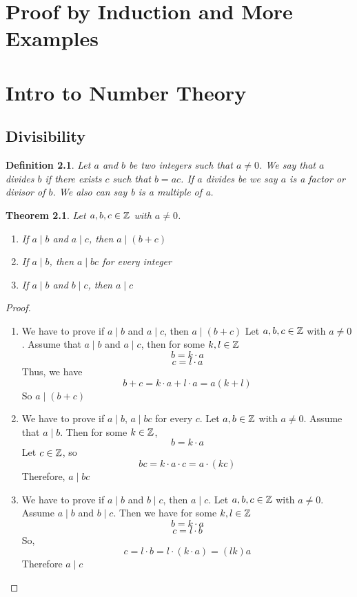 \documentclass[openany]{report}
\newtheorem{theorem}{Theorem}[section]
\newtheorem{definition}{Definition}[section]
\begin{document}
\chapter{Proof by Induction and More Examples}



\chapter{Intro to Number Theory}
\section{Divisibility}
\begin{definition}\label{definition4.1.1}
    Let $a$ and $b$ be two integers such that $a \neq 0$. We say that $a$ divides $b$ if there exists $c$ such that $b = ac$. If $a$ divides be we say $a$ is a factor or divisor of $b$. We also can say b is a multiple of a.
\end{definition}
\begin{theorem}\label{theorem4.1.1}
    Let $a,b,c \in \mathbb{Z}$ with $a \neq 0$.
    \begin{enumerate}
        \item If $a\mid b$ and $a \mid c$, then $a \mid (b + c)$
        \item If $a \mid b$, then $a \mid bc$ for every integer 
        \item If $a \mid b$ and $b \mid c$, then $a \mid c$
    \end{enumerate}
\end{theorem}
\begin{proof}
    \begin{enumerate}
        \item We have to prove if $a \mid b$ and $a\mid c$, then $a \mid (b + c)$
        Let $a,b,c \in \mathbb{Z}$ with $a \neq 0$. Assume that $a \mid b$ and $a \mid c$, then for some $k,l \in \mathbb{Z}$
        $$b = k \cdot a$$
        $$c = l \cdot a$$
        Thus, we have
        $$b + c = k \cdot a + l \cdot a  = a(k + l)$$
        So $a \mid (b+c)$
        \item We have to prove if $a \mid b$, $a \mid bc$ for every $c$. Let $a,b \in \mathbb{Z}$ with $a \neq 0$. Assume that $a \mid b$. Then for some $k \in \mathbb{Z}$,
        $$b = k \cdot a$$
        Let $c \in \mathbb{Z}$, so 
        $$bc = k \cdot a \cdot c = a \cdot (kc)$$
        Therefore, $a \mid bc$
        \item We have to prove if $a \mid b$ and $b \mid c$, then $a \mid c.$ Let $a,b,c \in \mathbb{Z}$ with $a \neq 0$. Assume $a \mid b$ and $b \mid c$. Then we have for some $k, l \in \mathbb{Z}$
        $$b = k \cdot a$$
        $$c = l \cdot b$$
        So, 
        $$c = l \cdot b = l \cdot (k \cdot a) = (lk)a$$
        Therefore $a \mid c$
    \end{enumerate}
\end{proof}
\end{document}
